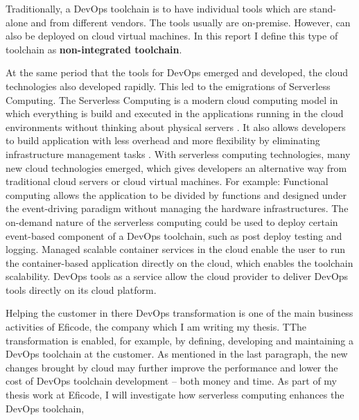 \par
Traditionally, a DevOps toolchain is to have individual tools which are stand-alone and from different vendors. The tools usually are on-premise. However, can also be deployed on cloud virtual machines. In this report I define this type of toolchain as \textbf{non-integrated toolchain}.
\par
At the same period that the tools for DevOps emerged and developed, the cloud technologies also developed rapidly. This led to the emigrations of Serverless Computing. 
The Serverless Computing is a modern cloud computing model in which everything is build and executed in the applications running in the cloud environments without thinking about physical servers \cite{Serverle81:online}. It also allows developers to build application with less overhead \cite{Serverle81:online} and more flexibility by eliminating infrastructure management tasks \cite{Serverle73:online}.
With serverless computing technologies, many new cloud technologies emerged, which gives developers an alternative way from traditional cloud servers or cloud virtual machines. For example: Functional computing allows the application to be divided by functions and designed under the event-driving paradigm without managing the hardware infrastructures. The on-demand nature of the serverless computing could be used to deploy certain event-based component of a DevOps toolchain, such as post deploy testing and logging.
Managed scalable container services in the cloud enable the user to run the container-based application directly on the cloud, which enables the toolchain scalability. DevOps tools as a service \cite{DevOpsas45:online} allow the cloud provider to deliver DevOps tools directly on its cloud platform.
\par
Helping the customer in there DevOps transformation is one of the main business activities of Eficode, the company which I am writing my thesis. TThe transformation is enabled, for example, by defining, developing and maintaining a DevOps toolchain at the customer. As mentioned in the last paragraph, the new changes brought by cloud may further improve the performance and lower the cost of DevOps toolchain development -- both money and time. As part of my thesis work at Eficode, I will investigate how serverless computing enhances the DevOps toolchain,
